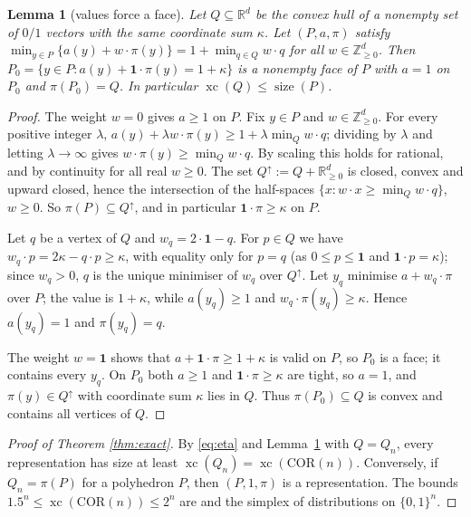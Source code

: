 \documentclass[11pt]{amsart}
\theoremstyle{plain}
\newtheorem{lemma}[theorem]{Lemma}
\theoremstyle{definition}
\theoremstyle{remark}
\newcommand{\R}{\mathbb{R}}
\newcommand{\Z}{\mathbb{Z}}
\newcommand{\one}{\mathbf{1}}
\newcommand{\COR}{\mathrm{COR}}
\newcommand{\xc}{\operatorname{xc}}
\newcommand{\size}{\operatorname{size}}
\begin{document}
\begin{lemma}[values force a face]\label{lem:face}
Let $Q\subseteq\R^d$ be the convex hull of a nonempty set of $0/1$ vectors with the same coordinate sum $\kappa$. Let
$(P,a,\pi)$ satisfy $\min_{y\in P}\{a(y)+w\cdot\pi(y)\}=1+\min_{q\in Q}w\cdot q$ for all $w\in\Z^d_{\ge0}$. Then
$P_0=\{y\in P:a(y)+\one\cdot\pi(y)=1+\kappa\}$ is a nonempty face of $P$ with $a=1$ on $P_0$ and $\pi(P_0)=Q$. In
particular $\xc(Q)\le\size(P)$.
\end{lemma}
\begin{proof}
The weight $w=0$ gives $a\ge1$ on $P$. Fix $y\in P$ and $w\in\Z^d_{\ge0}$. For every positive integer $\lambda$,
$a(y)+\lambda w\cdot\pi(y)\ge1+\lambda\min_Qw\cdot q$; dividing by $\lambda$ and letting $\lambda\to\infty$ gives
$w\cdot\pi(y)\ge\min_Qw\cdot q$. By scaling this holds for rational, and by continuity for all real $w\ge0$. The set
$Q^\uparrow:=Q+\R^d_{\ge0}$ is closed, convex and upward closed, hence the intersection of the half-spaces
$\{x:w\cdot x\ge\min_Qw\cdot q\}$, $w\ge0$. So $\pi(P)\subseteq Q^\uparrow$, and in particular $\one\cdot\pi\ge\kappa$
on $P$.

Let $q$ be a vertex of $Q$ and $w_q=2\cdot\one-q$. For $p\in Q$ we have $w_q\cdot p=2\kappa-q\cdot p\ge\kappa$, with
equality only for $p=q$ (as $0\le p\le\one$ and $\one\cdot p=\kappa$); since $w_q>0$, $q$ is the unique minimiser of
$w_q$ over $Q^\uparrow$. Let $y_q$ minimise $a+w_q\cdot\pi$ over $P$; the value is $1+\kappa$, while $a(y_q)\ge1$ and
$w_q\cdot\pi(y_q)\ge\kappa$. Hence $a(y_q)=1$ and $\pi(y_q)=q$.

The weight $w=\one$ shows that $a+\one\cdot\pi\ge1+\kappa$ is valid on $P$, so $P_0$ is a face; it contains every
$y_q$. On $P_0$ both $a\ge1$ and $\one\cdot\pi\ge\kappa$ are tight, so $a=1$, and $\pi(y)\in Q^\uparrow$ with
coordinate sum $\kappa$ lies in $Q$. Thus $\pi(P_0)\subseteq Q$ is convex and contains all vertices of $Q$.
\end{proof}

\begin{proof}[Proof of Theorem \ref{thm:exact}]
By \eqref{eq:eta} and Lemma~\ref{lem:face} with $Q=Q_n$, every representation has size at least
$\xc(Q_n)=\xc(\COR(n))$. Conversely, if $Q_n=\pi(P)$ for a polyhedron $P$, then $(P,1,\pi)$ is a representation.
The bounds $1.5^n\le\xc(\COR(n))\le2^n$ are \cite{KW} and the simplex of distributions on $\{0,1\}^n$.
\end{proof}
\end{document}
